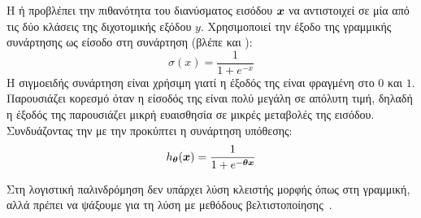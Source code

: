 Η   ή
προβλέπει την πιθανότητα του διανύσματος εισόδου $\vx$ να αντιστοιχεί σε μία από τις δύο κλάσεις της διχοτομικής εξόδου $y$.
Χρησιμοποιεί την έξοδο της γραμμικής συνάρτησης ως είσοδο στη
 συνάρτηση (βλέπε και ):
\begin{equation}
    \label{eq:sigmoid}
    \sigma(x) = \frac{1}{1 + e^{-x}}
\end{equation}
Η σιγμοειδής συνάρτηση είναι χρήσιμη γιατί η έξοδός της είναι φραγμένη στο $0$ και $1$.
Παρουσιάζει κορεσμό όταν η είσοδός της είναι πολύ μεγάλη σε απόλυτη τιμή, δηλαδή η έξοδός της παρουσιάζει μικρή ευαισθησία σε μικρές μεταβολές της εισόδου.
Συνδυάζοντας την  με την  προκύπτει η συνάρτηση υπόθεσης:
\begin{equation}
    \label{eq:logistic-regression}
    \hth(\vx) = \frac{1}{1 + e^{-\vth \vx}}
\end{equation}

Στη λογιστική παλινδρόμηση δεν υπάρχει λύση κλειστής μορφής όπως στη γραμμική, αλλά πρέπει να ψάξουμε για τη λύση με μεθόδους βελτιστοποίησης~\cite{Goodfellow-et-al-2016}.

